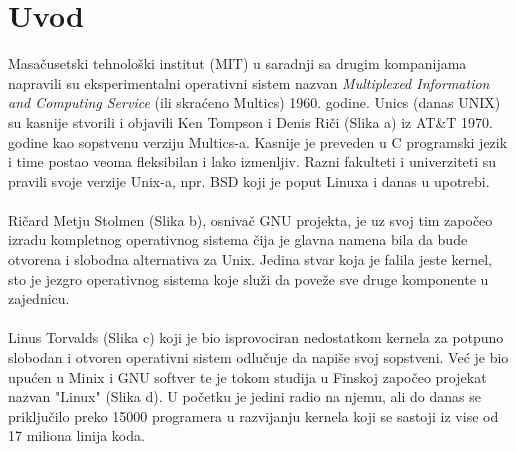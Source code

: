 \documentclass[a4paper,14pt]{article}
\begin{document}
\section*{Uvod\cite{revos}}
Masačusetski tehnološki institut (MIT) u saradnji sa drugim kompanijama napravili su eksperimentalni operativni sistem nazvan \textit{Multiplexed Information and Computing Service} (ili skraćeno Multics) 1960. godine. Unics (danas UNIX) su kasnije stvorili i objavili Ken Tompson i Denis Riči  (Slika a) iz AT\&T 1970. godine kao sopstvenu verziju Multics-a. Kasnije je preveden u C programski jezik i time postao veoma fleksibilan i lako izmenljiv. Razni fakulteti i univerziteti su pravili svoje verzije Unix-a, npr. BSD koji je poput Linuxa i danas u upotrebi.
\\\\
Ričard Metju Stolmen (Slika b), osnivač GNU projekta\cite{gnu}, je uz svoj tim započeo izradu kompletnog operativnog sistema čija je glavna namena  bila da bude otvorena i slobodna alternativa za Unix. Jedina stvar koja je falila jeste kernel, sto je jezgro operativnog sistema koje služi da poveže sve druge komponente u zajednicu.
\\\\
Linus Torvalds (Slika c) koji je bio isprovociran nedostatkom kernela za potpuno slobodan i otvoren operativni sistem odlučuje da napiše svoj sopstveni. Već je bio upućen u Minix i GNU softver te je tokom studija u Finskoj započeo projekat nazvan "Linux" (Slika d). U početku je jedini radio na njemu, ali do danas se priključilo preko 15000 programera u razvijanju kernela koji se sastoji iz vise od 17 miliona linija koda\cite{linuxfoundation}.
\\\\
\end{document}
